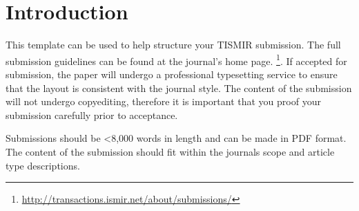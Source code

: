 \section{Introduction}\label{sec:introduction}


This template can be used to help structure your TISMIR submission. 
The full submission guidelines can be found at the journal's home page.%
\footnote{\url{http://transactions.ismir.net/about/submissions/}}.
If accepted for submission, the paper will undergo a professional 
typesetting service to ensure that the layout is consistent with the 
journal style. 
The content of the submission will not undergo copyediting, 
therefore it is important that you proof your submission carefully prior to acceptance.

Submissions should be <8,000 words in length and can be made in PDF format.
The content of the submission should fit within the journals scope
and article type descriptions.
